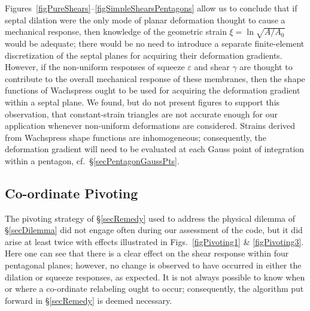 Figures~\ref{figPureShears}--\ref{figSimpleShearsPentagons} allow us to conclude that if septal dilation were the only mode of planar deformation thought to cause a mechanical response, then knowledge of the geometric strain $\xi = \ln \sqrt{A/A_0}$ would be adequate; there would be no need to introduce a separate finite-element discretization of the septal planes for acquiring their deformation gradients.  However, if the non-uniform responses of squeeze $\varepsilon$ and shear $\gamma$ are thought to contribute to the overall mechanical response of these membranes, then the shape functions of Wachspress \cite{Wachspress75,Wachspress16} ought to be used for acquiring the deformation gradient within a septal plane.  We found, but do not present figures to support this observation, that constant-strain triangles are not accurate enough for our application whenever non-uniform deformations are considered.  Strains derived from Wachspress shape functions are inhomogeneous; consequently, the deformation gradient will need to be evaluated at each Gauss point of integration within a pentagon, cf.\ \S\ref{secPentagonGaussPts}.

\subsection{Co-ordinate Pivoting}

The pivoting strategy of \S\ref{secRemedy} used to address the physical dilemma of \S\ref{secDilemma} did not engage often during our assessment of the code, but it did arise at least twice with effects illustrated in Figs.~\ref{figPivoting1} \& \ref{figPivoting3}.  Here one can see that there is a clear effect on the shear response within four pentagonal planes; however, no change is observed to have occurred in either the dilation or squeeze responses, as expected.  It is not always possible to know when or where a co-ordinate relabeling ought to occur; consequently, the algorithm put forward in \S\ref{secRemedy} is deemed necessary.

